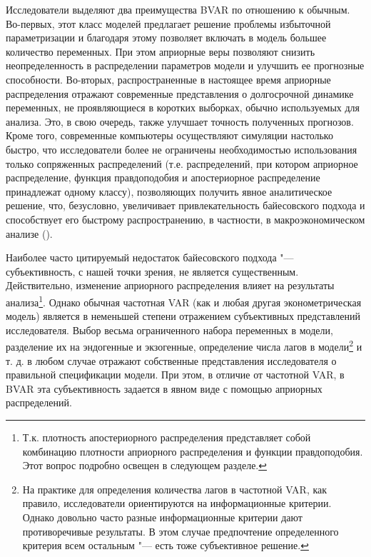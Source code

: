 \documentclass[11pt]{article} %
\begin{document}
 Исследователи выделяют два преимущества BVAR по отношению к обычным. Во-первых, этот класс моделей предлагает решение проблемы избыточной параметризации и благодаря этому позволяет включать в модель большее количество переменных. При этом априорные веры позволяют снизить неопределенность в распределении параметров модели и улучшить ее прогнозные способности. Во-вторых, распространенные в настоящее время  априорные распределения отражают современные представления о  долгосрочной динамике переменных, не проявляющиеся в коротких выборках, обычно используемых для анализа. Это, в свою очередь, также улучшает точность полученных прогнозов. Кроме того, современные компьютеры осуществляют симуляции настолько быстро, что исследователи  более не ограничены необходимостью использования только сопряженных распределений (т.е. распределений, при котором  априорное распределение, функция правдоподобия и апостериорное распределение принадлежат одному классу), позволяющих получить явное аналитическое решение, что, безусловно, увеличивает привлекательность байесовского подхода и способствует его быстрому распространению, в частности, в макроэкономическом анализе (\cite{karlsson_2012}).


Наиболее часто цитируемый недостаток байесовского подхода "--- субъективность, с нашей точки зрения, не является существенным. Действительно, изменение априорного распределения влияет на  результаты анализа\footnote{Т.к. плотность апостериорного распределения представляет собой комбинацию плотности априорного распределения и функции правдоподобия. Этот вопрос подробно освещен в следующем разделе.}. Однако обычная частотная VAR (как и любая другая эконометрическая модель) является в неменьшей степени отражением субъективных представлений исследователя. Выбор весьма ограниченного набора переменных в модели, разделение их на эндогенные и экзогенные, определение числа лагов в модели\footnote{На практике для определения количества лагов в частотной VAR, как правило, исследователи ориентируются на информационные критерии. Однако довольно часто разные информационные критерии дают противоречивые результаты. В этом случае предпочтение определенного критерия всем остальным "--- есть тоже субъективное решение.} и т. д. в любом случае отражают собственные представления исследователя о правильной спецификации модели. При этом, в отличие от частотной VAR, в BVAR эта субъективность задается в явном виде с помощью априорных распределений.
\end{document}
